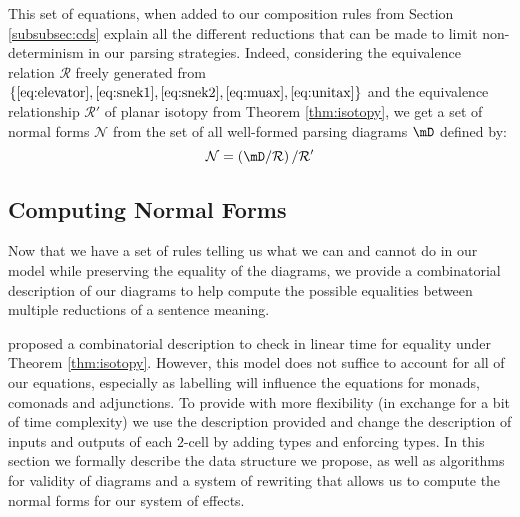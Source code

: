 This set of equations, when added to our composition rules from Section \ref{subsubsec:cds} explain all the different reductions that can be made to limit non-determinism in our parsing strategies.
Indeed, considering the equivalence relation $\mathcal{R}$ freely generated from $\left\{ \eqref{eq:elevator}, \eqref{eq:snek1}, \eqref{eq:snek2}, \eqref{eq:muax}, \eqref{eq:unitax} \right\}$ and the equivalence relationship $\mathcal{R}'$ of planar isotopy from Theorem \ref{thm:isotopy}, we get a set of normal forms $\mathcal{N}$ from the set of all well-formed parsing diagrams $\mD$ defined by:
\begin{equation*}
	\mathcal{N} = \left( \mD / \mathcal{R} \right) / \mathcal{R}'
\end{equation*}

\subsection{Computing Normal Forms}
Now that we have a set of rules telling us what we can and cannot do in our model while preserving the equality of the diagrams, we provide a combinatorial description of our diagrams to help compute the possible equalities between multiple reductions of a sentence meaning.

 proposed a combinatorial description to check
in linear time for equality under Theorem \ref{thm:isotopy}.
However, this model does not suffice to account for all of our equations, especially as
labelling will influence the equations for monads, comonads and adjunctions.
To provide with more flexibility (in exchange for a bit of time complexity) we use the
description provided and change the description of inputs and outputs of each $2$-cell by
adding types and enforcing types.
In this section we formally describe the data structure we propose, as well as algorithms for
validity of diagrams and a system of rewriting that allows us to compute the normal forms
for our system of effects.

